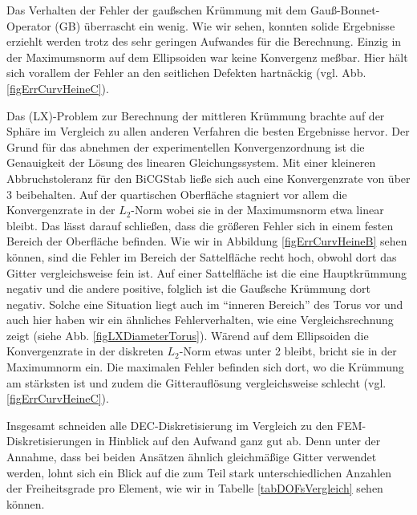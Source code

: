   Das Verhalten der Fehler der gaußschen Krümmung mit dem Gauß-Bonnet-Operator (GB) überrascht ein wenig.
  Wie wir sehen, konnten solide Ergebnisse erziehlt werden trotz des sehr geringen Aufwandes für die Berechnung.
  Einzig in der Maximumsnorm auf dem Ellipsoiden war keine Konvergenz meßbar.
  Hier hält sich vorallem der Fehler an den seitlichen Defekten hartnäckig (vgl. Abb.
  \ref{figErrCurvHeineC}).

  Das (LX)-Problem zur Berechnung der mittleren Krümmung brachte auf der Sphäre im Vergleich zu allen
  anderen Verfahren die besten Ergebnisse hervor. 
  Der Grund für das abnehmen der experimentellen Konvergenzordnung ist die Genauigkeit der Lösung des
  linearen Gleichungssystem.
  Mit einer kleineren Abbruchstoleranz für den BiCGStab ließe sich auch eine Konvergenzrate von über 3
  beibehalten.
  Auf der quartischen Oberfläche stagniert vor allem die Konvergenzrate in der \( L_{2} \)-Norm wobei sie
  in der Maximumsnorm etwa linear bleibt. 
  Das lässt darauf schließen, dass die größeren Fehler sich in einem festen Bereich der Oberfläche
  befinden.
  Wie wir in Abbildung \ref{figErrCurvHeineB} sehen können, sind die Fehler im Bereich der Sattelfläche
  recht hoch, obwohl dort das Gitter vergleichsweise fein ist.
  Auf einer Sattelfläche ist die eine Hauptkrümmung negativ und die andere positive, folglich ist die
  Gaußsche Krümmung dort negativ. 
  Solche eine Situation liegt auch im "`inneren Bereich"' des Torus vor und auch hier haben wir ein ähnliches
  Fehlerverhalten, wie eine Vergleichsrechnung zeigt (siehe Abb. \ref{figLXDiameterTorus}).
  Wärend auf dem Ellipsoiden die Konvergenzrate in der diskreten \( L_{2} \)-Norm etwas unter 2 bleibt,
  bricht sie in der Maximumnorm ein.
  Die maximalen Fehler befinden sich dort, wo die Krümmung am stärksten ist und zudem die
  Gitterauflösung vergleichsweise schlecht (vgl. \ref{figErrCurvHeineC}).

  Insgesamt schneiden alle DEC-Diskretisierung im Vergleich zu den FEM-Diskretisierungen in Hinblick auf den Aufwand ganz gut ab.
  Denn unter der Annahme, dass bei beiden Ansätzen ähnlich gleichmäßige Gitter verwendet werden, lohnt sich ein Blick auf die zum Teil stark unterschiedlichen Anzahlen der Freiheitsgrade
  pro Element, wie wir in Tabelle \ref{tabDOFsVergleich} sehen können. 

